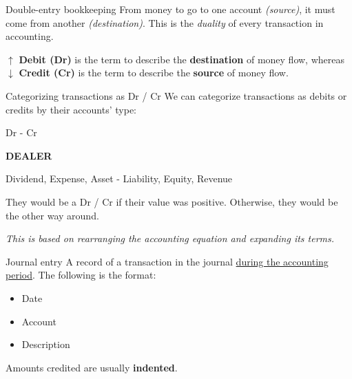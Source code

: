 \begin{theorem}
    {Double-entry bookkeeping}
    From money to go to one account \textit{(source)}, it must come from another \textit{(destination)}. This is the \textit{duality} of every transaction in accounting.

    $\uparrow$ \textbf{Debit (Dr)} is the term to describe the \textbf{destination} of money flow, whereas $\downarrow$ \textbf{Credit (Cr)} is the term to describe the \textbf{source} of money flow.
\end{theorem}
\label{thm:debit_credit}

\begin{knBox}
    {Categorizing transactions as Dr / Cr}
    We can categorize transactions as debits or credits by their accounts' type:
    \vspace{0.5em}
    \begin{center}
        \small
        Dr - Cr
        \normalsize

        \textbf{DEALER}

        Dividend, Expense, Asset - Liability, Equity, Revenue
    \end{center}
    They would be a Dr / Cr if their value was positive. Otherwise, they would be the other way around.

    \textit{This is based on rearranging the accounting equation and expanding its terms.}
\end{knBox}

\begin{definition}
    {Journal entry}
    A record of a transaction in the journal \underline{during the accounting period}. The following is the format:
    \begin{itemize}
        \item Date
        \item Account
        \item Description
    \end{itemize}
    Amounts credited are usually \textbf{indented}.
\end{definition}

